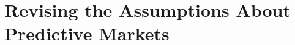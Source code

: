 \section{Revising the Assumptions About Predictive Markets}
\label{sec:revising_assumptions}

\lipsum[2]

